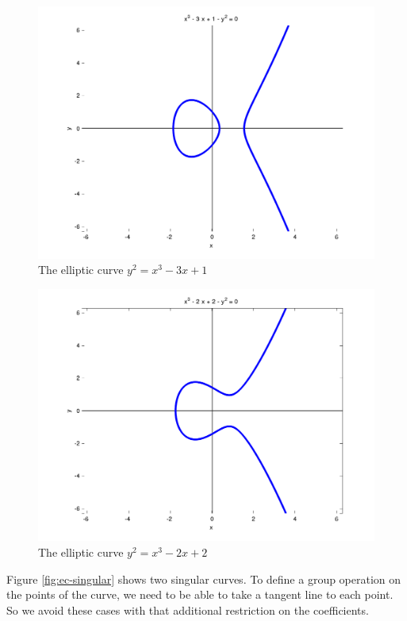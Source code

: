 \documentclass{article}
\begin{document}
\begin{figure}[h]
\centering
\includegraphics[width=\textwidth]{images/ec1.png}
\caption{The elliptic curve $y^2 = x^3 - 3x + 1$}
\label{fig:ec-plot}
\end{figure}

\begin{figure}[h]
\centering
\includegraphics[width=\textwidth]{images/ec4g.png}
\caption{The elliptic curve $y^2 = x^3 - 2x + 2$}
\label{fig:ec-plot2}
\end{figure}

Figure \ref{fig:ec-singular} shows two singular curves.
To define a group operation on the points of the curve, we need to be able to take a tangent line to each point.
So we avoid these cases with that additional restriction on the coefficients.
\end{document}
